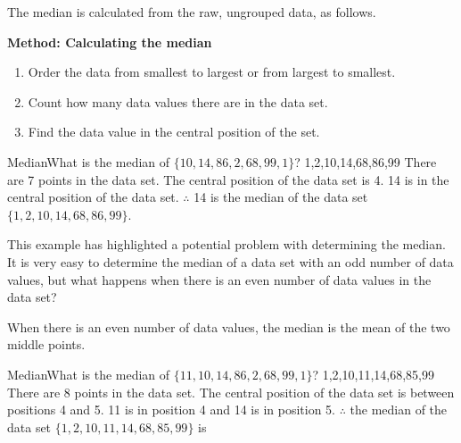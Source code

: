 \documentclass[10pt,a4paper,titlepage,twoside,openright]{report}
\begin{document}

The median is calculated from the raw, ungrouped data, as follows.

\textbf{Method: Calculating the median}
\begin{enumerate}
\item Order the data from smallest to largest or from largest to smallest.
\item Count how many data values there are in the data set.
\item Find the data value in the central position of the set.
\end{enumerate}

\begin{wex}{Median}{What is the median of $\{10,14,86,2,68,99,1\}$?}
{
{1,2,10,14,68,86,99}
There are 7 points in the data set.
The central position of the data set is 4.
14 is in the central position of the data set.
$\therefore$ 14 is the median of the data set $\{1,2,10,14,68,86,99\}$.
}
\end{wex}

This example has highlighted a potential problem with determining the median. It is very easy to determine the median of a data set with an odd number of data values, but what happens when there is an even number of data values in the data set?

When there is an even number of data values, the median is the mean of the two middle points.


\begin{wex}{Median}{What is the median of $\{11,10,14,86,2,68,99,1\}$?}
{
{1,2,10,11,14,68,85,99}
There are 8 points in the data set.
The central position of the data set is between positions 4 and 5.
11 is in position 4 and 14 is in position 5.
$\therefore$ the median of the data set $\{1,2,10,11,14,68,85,99\}$ is }
\end{wex}
\end{document}
